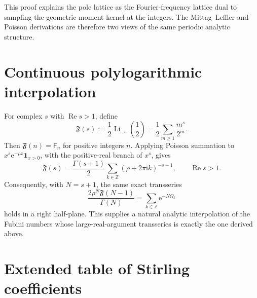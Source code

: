 \documentclass[11pt,oneside]{article}
\numberwithin{equation}{section}
\newcommand{\e}{\mathrm e}
\newcommand{\ii}{\mathrm i}
\newcommand{\Z}{\mathbb Z}
\newcommand{\Fub}{\mathsf F}
\newcommand{\Li}{\operatorname{Li}}
\newcommand{\paren}[1]{\left(#1\right)}
\newcommand{\RePart}{\operatorname{Re}}
\begin{document}
This proof explains the pole lattice as the Fourier-frequency lattice dual to sampling the geometric-moment kernel at the integers.  The Mittag--Leffler and Poisson derivations are therefore two views of the same periodic analytic structure.

\section{Continuous polylogarithmic interpolation}
\label{app:polylog}

For complex \(s\) with \(\RePart s>1\), define
\begin{equation}
 \mathfrak F(s):=\frac12\Li_{-s}\!\paren{\frac12}
 =\frac12\sum_{m\ge1}\frac{m^s}{2^m}.
 \label{eq:continuous-fubini}
\end{equation}
Then \(\mathfrak F(n)=\Fub_n\) for positive integers \(n\).  Applying Poisson summation to \(x^s\e^{-\rho x}\mathbf 1_{x>0}\), with the positive-real branch of \(x^s\), gives
\begin{equation}
 \boxed{\displaystyle
 \mathfrak F(s)=\frac{\Gamma(s+1)}{2}
 \sum_{k\in\Z}(\rho+2\pi\ii k)^{-s-1},
 \qquad \RePart s>1.}
 \label{eq:continuous-pole-formula}
\end{equation}
Consequently, with \(N=s+1\), the same exact transseries
\[
 \frac{2\rho^N\mathfrak F(N-1)}{\Gamma(N)}
 =\sum_{k\in\Z}\e^{-N\Omega_k}
\]
holds in a right half-plane.  This supplies a natural analytic interpolation of the Fubini numbers whose large-real-argument transseries is exactly the one derived above.

\section{Extended table of Stirling coefficients}
\label{app:coeff-table}
\end{document}
